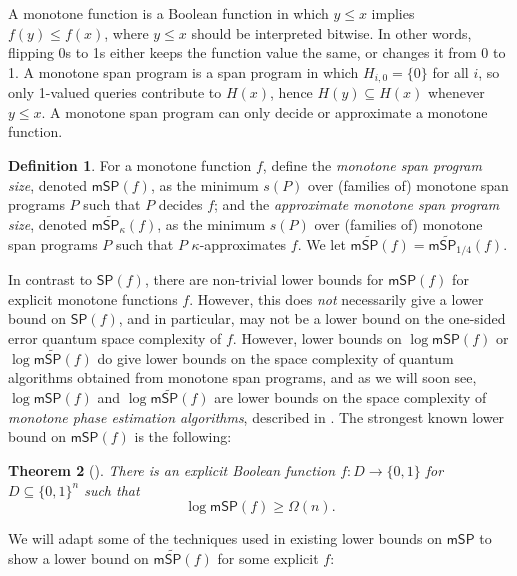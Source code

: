 \documentclass[11pt]{article}
\numberwithin{equation}{section}
\newtheorem{theorem}{Theorem}[section]
\theoremstyle{definition}
\newtheorem{definition}[theorem]{Definition}
\theoremstyle{plain}
\begin{document}
A monotone function is a Boolean function in which $y\leq x$ implies $f(y)\leq f(x)$, where $y\leq x$ should be interpreted bitwise. In other words, flipping 0s to 1s either keeps the function value the same, or changes it from 0 to 1. 
A monotone span program is a span program in which $H_{i,0}=\{0\}$ for all $i$, so only 1-valued queries contribute to $H(x)$, hence $H(y)\subseteq H(x)$ whenever $y\leq x$. A monotone span program can only decide or approximate a monotone function. 

\begin{definition}\label{def:monotoneSP}
For a monotone function $f$, define the \emph{monotone span program size}, denoted $\mathsf{mSP}(f)$, as the minimum $s(P)$ over (families of) monotone span programs $P$ such that $P$ decides $f$; and the \emph{approximate monotone span program size}, denoted $\mathsf{m}\widetilde{\mathsf{SP}}_\kappa(f)$, as the minimum $s(P)$ over (families of) monotone span programs $P$ such that $P$ $\kappa$-approximates $f$. We let $\mathsf{m}\widetilde{\mathsf{SP}}(f)=\mathsf{m}\widetilde{\mathsf{SP}}_{1/4}(f)$.
\end{definition}

In contrast to $\mathsf{SP}(f)$, there are non-trivial lower bounds for $\mathsf{mSP}(f)$ for explicit monotone functions $f$. However, this does \emph{not} necessarily give a lower bound on $\mathsf{SP}(f)$, and in particular, may not be a lower bound on the one-sided error quantum space complexity of $f$. However, lower bounds on $\log\mathsf{mSP}(f)$ or $\log\mathsf{m}\widetilde{\mathsf{SP}}(f)$ do give lower bounds on the space complexity of quantum algorithms obtained from monotone span programs, and as we will soon see, $\log\mathsf{mSP}(f)$ and $\log\mathsf{m}\widetilde{\mathsf{SP}}(f)$ are lower bounds on the space complexity of \emph{monotone phase estimation algorithms}, described in .
The strongest known lower bound on $\mathsf{mSP}(f)$ is the following:
\begin{theorem}[\cite{PR17}]\label{thm:PR}
There is an explicit Boolean function $f:D\rightarrow\{0,1\}$ for $D\subseteq\{0,1\}^n$ such that
$$\log\mathsf{mSP}(f)\geq \Omega(n).$$
\end{theorem}

We will adapt some of the techniques used in existing lower bounds on $\mathsf{mSP}$ to show a lower bound on $\mathsf{m}\widetilde{\mathsf{SP}}(f)$ for some explicit $f$:
\end{document}
